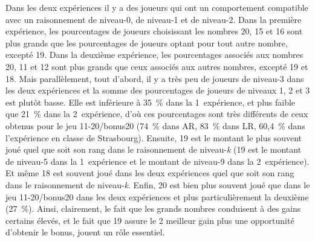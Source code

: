 \begin{Article}
\begin{refsection}[UmbhauerFR]
Dans les deux expériences il y a des joueurs qui ont un comportement
compatible avec un raisonnement de niveau-0, de niveau-1 et de niveau-2.
Dans la première expérience, les pourcentages de joueurs choisissant les
nombres 20, 15 et 16 sont plus grands que les pourcentages de joueurs
optant pour tout autre nombre, excepté 19. Dans la deuxième expérience,
les pourcentages associés aux nombres 20, 11 et 12 sont plus grands que
ceux associés aux autres nombres, excepté 19 et 18. Mais parallèlement,
tout d'abord, il y a très peu de joueurs de niveau-3 dans les deux
expériences et la somme des pourcentages de joueurs de niveaux 1, 2 et 3
est plutôt basse. Elle est inférieure à 35~\% dans la
1\iere{}~expérience, et plus faible que 21~\% dans la
2\ieme{}~expérience, d'où ces pourcentages sont très
différents de ceux obtenus pour le jeu 11-20/bonus20 (74~\% dans AR, 83~\%
dans LR, 60,4~\% dans l'expérience en classe de Strasbourg). Ensuite, 19
est le montant le plus souvent joué quel que soit son rang dans le
raisonnement de niveau-\emph{k} (19 est le montant de niveau-5 dans la
1\iere{}~expérience et le montant de niveau-9 dans la
2\ieme{}~expérience). Et même 18 est souvent joué dans les
deux expériences quel que soit son rang dans le raisonnement de
niveau-\emph{k}. Enfin, 20 est bien plus souvent joué que dans le jeu
11-20/bonus20 dans les deux expériences et plus particulièrement la
deuxième (27~\%). Ainsi, clairement, le fait que les grands nombres
conduisent à des gains certains élevés, et le fait que 19 assure le
2\ieme{} meilleur gain plus une opportunité d'obtenir le
bonus, jouent un rôle essentiel.


\end{refsection}
\end{Article}
